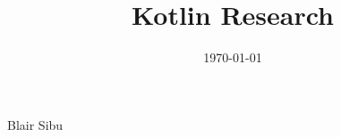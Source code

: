 \documentclass[11pt]{article}
\begin{document}

\title  {Kotlin Research}
            {Blair Sibu}
\date       {\today}

\maketitle



















\end{document}
